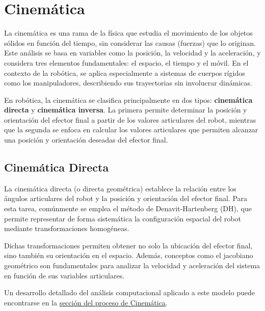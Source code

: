 \section{Cinemática} \label{sec:cinematica}

La cinemática es una rama de la física que estudia el movimiento de los objetos sólidos en función del tiempo, sin considerar las causas (fuerzas) que lo originan. Este análisis se basa en variables como la posición, la velocidad y la aceleración, y considera tres elementos fundamentales: el espacio, el tiempo y el móvil. En el contexto de la robótica, se aplica especialmente a sistemas de cuerpos rígidos como los manipuladores, describiendo sus trayectorias sin involucrar dinámicas.

En robótica, la cinemática se clasifica principalmente en dos tipos: \textbf{cinemática directa} y \textbf{cinemática inversa}. La primera permite determinar la posición y orientación del efector final a partir de los valores articulares del robot, mientras que la segunda se enfoca en calcular los valores articulares que permiten alcanzar una posición y orientación deseadas del efector final.

\subsection{Cinemática Directa}

La cinemática directa (o directa geométrica) establece la relación entre los ángulos articulares del robot y la posición y orientación del efector final. Para esta tarea, comúnmente se emplea el método de Denavit-Hartenberg (DH), que permite representar de forma sistemática la configuración espacial del robot mediante transformaciones homogéneas.

Dichas transformaciones permiten obtener no solo la ubicación del efector final, sino también su orientación en el espacio. Además, conceptos como el jacobiano geométrico son fundamentales para analizar la velocidad y aceleración del sistema en función de sus variables articulares.

Un desarrollo detallado del análisis computacional aplicado a este modelo puede encontrarse en la \hyperref[sec:proceso_cinematica]{sección del proceso de Cinemática}.

